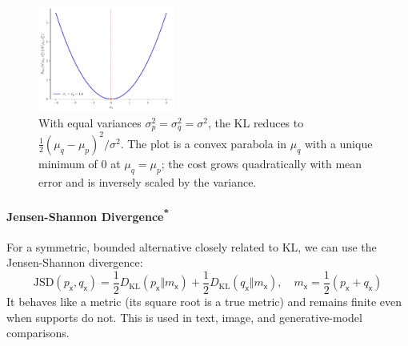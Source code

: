 \begin{exampleBox}
    \begin{figure}[H]
        \centering
        \includegraphics[width=0.4\textwidth]{figs/probability/gaussian_kl_mu.pdf}
        \caption{With equal variances $\sigma_p^2=\sigma_q^2 = \sigma^2$, the KL reduces to $\tfrac{1}{2}(\mu_q-\mu_p)^2/\sigma^2$. The plot is a convex parabola in $\mu_q$ with a unique minimum of $0$ at $\mu_q=\mu_p$; the cost grows quadratically with mean error and is inversely scaled by the variance.}
        \label{fig:gaussian-kl-mu-sigma}
    \end{figure}
\end{exampleBox}
    
\paragraph*{\texorpdfstring{Jensen-Shannon Divergence\textsuperscript{*}}{Jensen-Shannon Divergence}} For a symmetric, bounded alternative closely related to KL, we can use the Jensen-Shannon divergence:
\begin{equation}
    \mathrm{JSD}(p_{\mathsf{x}},q_{\mathsf{x}})=\frac12 D_{\mathrm{KL}}(p_{\mathsf{x}}\Vert m_{\mathsf{x}})+\frac12 D_{\mathrm{KL}}(q_{\mathsf{x}}\Vert m_{\mathsf{x}}), \quad m_{\mathsf{x}}=\frac12(p_{\mathsf{x}}+q_{\mathsf{x}})
\end{equation}
It behaves like a metric (its square root is a true metric) and remains finite even when supports do not. This is used in text, image, and generative-model comparisons.

